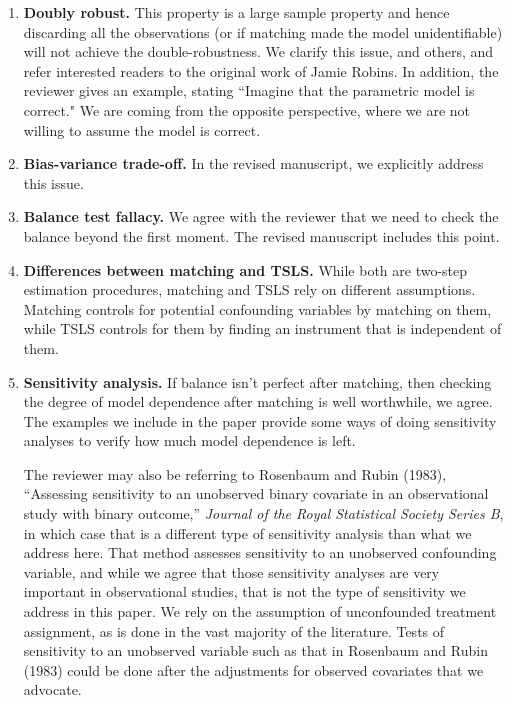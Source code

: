 \documentclass[11pt]{article}
\begin{document}
\begin{enumerate}
\item {\bf Doubly robust.} This property is a large sample property
  and hence discarding all the observations (or if matching made the
  model unidentifiable) will not achieve the double-robustness.  We
  clarify this issue, and others, and refer interested readers to the
  original work of Jamie Robins.  In addition, the reviewer gives an example,
  stating ``Imagine that the parametric model is correct."  We are coming
  from the opposite perspective, where we are not willing to assume the model
  is correct.  
 
\item {\bf Bias-variance trade-off.} In the revised manuscript, we
  explicitly address this issue.

\item {\bf Balance test fallacy.} We agree with the reviewer that we
  need to check the balance beyond the first moment.  The revised
  manuscript includes this point.


\item {\bf Differences between matching and TSLS.} While both are
  two-step estimation procedures, matching and TSLS rely on different
  assumptions. Matching controls for potential confounding variables
  by matching on them, while TSLS controls for them by finding an
  instrument that is independent of them.
  
\item {\bf Sensitivity analysis.} If balance isn't perfect after
  matching, then checking the degree of model dependence after
  matching is well worthwhile, we agree.  The examples we include in
  the paper provide some ways of doing sensitivity analyses to verify
  how much model dependence is left.
  
  The reviewer may also be referring to Rosenbaum and Rubin (1983),
  ``Assessing sensitivity to an unobserved binary covariate in an
  observational study with binary outcome,'' {\it Journal of the Royal
    Statistical Society Series B}, in which case that is a different
  type of sensitivity analysis than what we address here.  That method
  assesses sensitivity to an unobserved confounding variable, and
  while we agree that those sensitivity analyses are very important in
  observational studies, that is not the type of sensitivity we
  address in this paper.  We rely on the assumption of unconfounded
  treatment assignment, as is done in the vast majority of the
  literature.  Tests of sensitivity to an unobserved variable such as
  that in Rosenbaum and Rubin (1983) could be done after the
  adjustments for observed covariates that we advocate.  
  

\end{enumerate}
\end{document}
